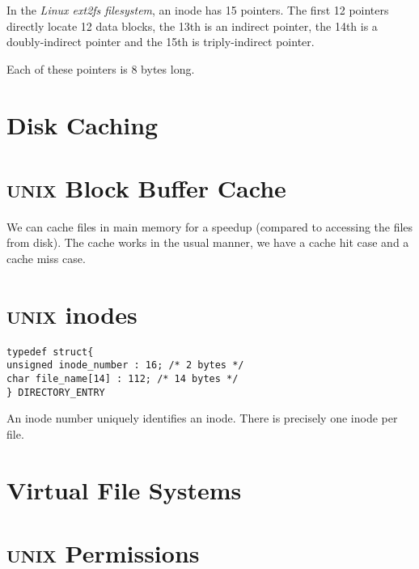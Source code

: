 \begin{example}
In the \textit{Linux ext2fs filesystem}, an inode has 15 pointers.
The first 12 pointers directly locate 12 data blocks, 
the 13th is an indirect pointer, the 14th is a doubly-indirect pointer and the 
15th is triply-indirect pointer. 

Each of these pointers is 8 bytes long.

\end{example}


\section{Disk Caching}



\section{\textsc{unix} Block Buffer Cache}

We can cache files in main memory for a speedup (compared to accessing the files 
from disk). The cache works in the usual manner, we have a cache hit case and a 
cache miss case.



\section{\textsc{unix} inodes}


\begin{lstlisting}
typedef struct{
unsigned inode_number : 16; /* 2 bytes */
char file_name[14] : 112; /* 14 bytes */
} DIRECTORY_ENTRY
\end{lstlisting}

An inode number uniquely identiﬁes an inode.
There is precisely one inode per ﬁle.

\section{Virtual File Systems}


\section{\textsc{unix} Permissions}




